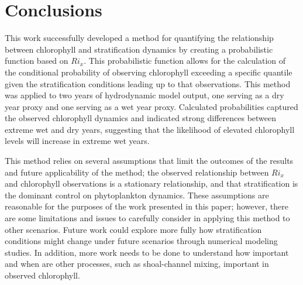 \documentclass[preprint,review,12pt]{elsarticle}
\begin{document}
\section{Conclusions}\label{S:conclusion}
This work successfully developed a method for quantifying the relationship between chlorophyll and stratification dynamics by creating a probabilistic function based on \(Ri_x\). This probabilistic function allows for the calculation of the conditional probability of observing chlorophyll exceeding a specific quantile given the stratification conditions leading up to that observations. This method was applied to two years of hydrodynamic model output, one serving as a dry year proxy and one serving as a wet year proxy. Calculated probabilities captured the observed chlorophyll dynamics and indicated strong differences between extreme wet and dry years, suggesting that the likelihood of elevated chlorophyll levels will increase in extreme wet years. 

This method relies on several assumptions that limit the outcomes of the results and future applicability of the method; the observed relationship between \(Ri_x\) and chlorophyll observations is a stationary relationship, and that stratification is the dominant control on phytoplankton dynamics. These assumptions are reasonable for the purposes of the work presented in this paper; however, there are some limitations and issues to carefully consider in applying this method to other scenarios. Future work could explore more fully how stratification conditions might change under future scenarios through numerical modeling studies. In addition, more work needs to be done to understand how important and when are other processes, such as shoal-channel mixing, important in observed chlorophyll.













\end{document}
